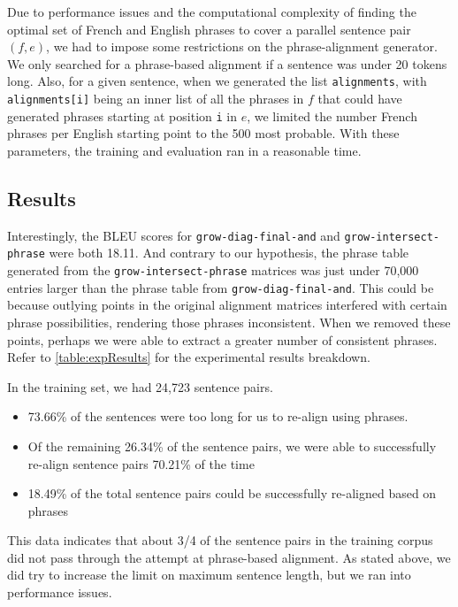 \documentclass[twocolumn]{article}
\newcommand{\originalAlign}{\texttt{grow-diag-final-and}}
\newcommand{\phraseIntersectAlign}{\texttt{grow-intersect-phrase}}
\begin{document}
Due to performance issues and the computational complexity of finding the
optimal set of French and English phrases to cover a parallel sentence pair
$(f, e)$, we had to impose some restrictions on the phrase-alignment generator.
We only searched for a phrase-based alignment if a sentence was under 20 tokens
long.
Also, for a given sentence, when we generated the list
\texttt{alignments}, with \texttt{alignments[i]} being
an inner list of all the phrases in $f$ that could have generated phrases
starting at position \texttt{i} in $e$, we limited the number French phrases per
English starting point to the 500 most probable.
With these parameters, the training and evaluation ran in a reasonable time.


\subsection{Results}
Interestingly, the BLEU scores for \originalAlign{} and \phraseIntersectAlign{}
were both 18.11. And contrary to our hypothesis, the phrase table generated from
the \phraseIntersectAlign{} matrices was just under 70,000 entries larger than
the phrase table from \originalAlign{}. This could be because outlying points in
the original alignment matrices interfered with certain phrase possibilities,
rendering those phrases inconsistent. When we removed these points, perhaps we
were able to extract a greater number of consistent phrases.
Refer to \ref{table:expResults} for the experimental results breakdown.

In the training set, we had 24,723 sentence pairs.
\begin{itemize}
  \item 73.66\% of the sentences were too long for us to re-align using phrases.
  \item Of the remaining 26.34\% of the sentence pairs, we were able to
    successfully re-align sentence pairs 70.21\% of the time
  \item 18.49\% of the total sentence pairs could be successfully re-aligned
    based on phrases
\end{itemize}
This data indicates that about 3/4 of the sentence pairs in the training corpus
did not pass through the attempt at phrase-based alignment. As stated above, we
did try to increase the limit on maximum sentence length, but we ran into
performance issues.
\end{document}
